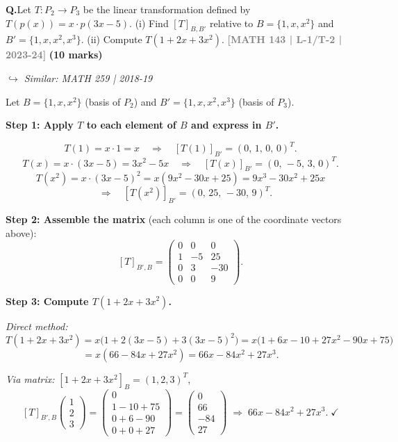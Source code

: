 \documentclass[12pt,a3paper]{article}
\newcommand{\yr}[1]{\hfill\textcolor{gray}{\small\textbf{[#1]}}}
\newcommand{\mk}[1]{\textcolor{orange!70!black}{\small\textbf{(#1 marks)}}}
\newcommand{\variant}[1]{\par\vspace{1pt}\textcolor{blue!50!black}%
  {\footnotesize\textit{$\hookrightarrow$ Similar: #1}}}
\newcounter{qnum}
\newcommand{\Q}[1]{%
  \needspace{4\baselineskip}
  \refstepcounter{qnum}
  \vspace{6pt}
  \noindent\textbf{Q\theqnum.}\enspace #1\par
}
\begin{document}
\Q{Let $T: P_2 \to P_3$ be the linear transformation defined by $T(p(x)) = x \cdot p(3x-5)$. (i) Find $[T]_{B,B'}$ relative to $B = \{1, x, x^2\}$ and $B' = \{1, x, x^2, x^3\}$. (ii) Compute $T(1 + 2x + 3x^2)$.
\yr{MATH 143 | L-1/T-2 | 2023-24} \mk{10}
\variant{MATH 259 | 2018-19}}


\begin{tcolorbox}[enhanced,breakable,
  colback=cF!4,colframe=cF,boxrule=0.8pt,arc=5pt,
  title={\textbf{Answer --- $T:P_2\to P_3$, $T(p(x))=x\cdot p(3x-5)$; Matrix \& Computation}},
  fonttitle=\bfseries\color{white},colbacktitle=cF]

Let $B=\{1,x,x^2\}$ (basis of $P_2$) and $B'=\{1,x,x^2,x^3\}$ (basis of $P_3$).

\medskip\textbf{Step 1: Apply $T$ to each element of $B$ and express in $B'$.}

\[
T(1)=x\cdot 1=x \quad\Rightarrow\quad [T(1)]_{B'}=(0,\,1,\,0,\,0)^T.
\]
\[
T(x)=x\cdot(3x-5)=3x^2-5x \quad\Rightarrow\quad [T(x)]_{B'}=(0,\,-5,\,3,\,0)^T.
\]
\[
T(x^2)=x\cdot(3x-5)^2=x(9x^2-30x+25)=9x^3-30x^2+25x 
\]
\[
\quad\Rightarrow\quad [T(x^2)]_{B'}=(0,\,25,\,-30,\,9)^T.
\]

\textbf{Step 2: Assemble the matrix} (each column is one of the coordinate vectors above):
\[
[T]_{B',B}=\begin{pmatrix}0&0&0\\1&-5&25\\0&3&-30\\0&0&9\end{pmatrix}.
\]

\textbf{Step 3: Compute $T(1+2x+3x^2)$.}

\textit{Direct method:}
\[
T(1+2x+3x^2)=x\bigl(1+2(3x-5)+3(3x-5)^2\bigr)
=x\bigl(1+6x-10+27x^2-90x+75\bigr)
\]
\[
=x(66-84x+27x^2)
=\boxed{66x-84x^2+27x^3}.
\]

\textit{Via matrix:} $[1+2x+3x^2]_B=(1,2,3)^T$,
\[
[T]_{B',B}\begin{pmatrix}1\\2\\3\end{pmatrix}
=\begin{pmatrix}0\\1-10+75\\0+6-90\\0+0+27\end{pmatrix}
=\begin{pmatrix}0\\66\\-84\\27\end{pmatrix}
\;\Rightarrow\; 66x-84x^2+27x^3.\;\checkmark
\]


\end{tcolorbox}
\end{document}
